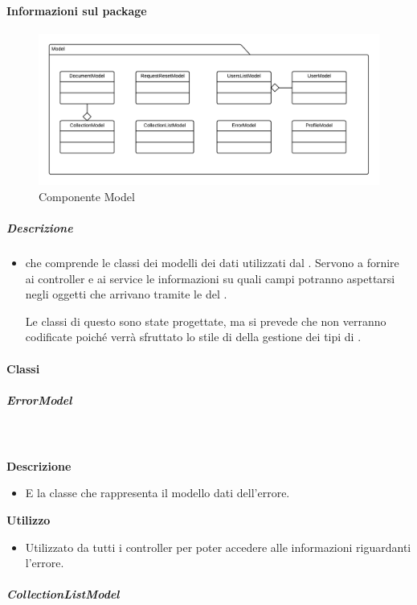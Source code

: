   \paragraph{Informazioni sul package}
    \begin{figure}[H] 
      \begin{center}
        \includegraphics[width=\textwidth]{uml/package/Front-end::Model.png}
        \caption{Componente Model}
      \end{center}  
    \end{figure} 
  \subparagraph{Descrizione} 
    \begin{itemize}
    \item[]  che comprende le classi dei modelli dei dati utilizzati dal . Servono a fornire ai controller e ai service le informazioni su quali campi potranno aspettarsi negli oggetti che arrivano tramite le  del .

Le classi di questo  sono state progettate, ma si prevede che non verranno codificate poiché verrà sfruttato lo stile di  della gestione dei tipi di .
    \end{itemize} 
    \paragraph{Classi}
      \subparagraph{ErrorModel}
        
        \textbf{\\ \\ Descrizione} 
          \begin{itemize}
            \item[] E la classe che rappresenta il modello dati dell'errore.
          \end{itemize}      
        \textbf{Utilizzo}  
          \begin{itemize}
            \item[] Utilizzato da tutti i controller per poter accedere alle informazioni riguardanti l'errore.
          \end{itemize}
      \subparagraph{CollectionListModel}
        

